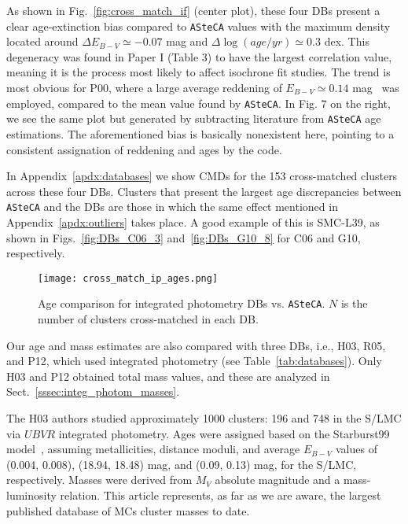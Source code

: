 \documentclass{aa}
\begin{document}
As shown in Fig.~\ref{fig:cross_match_if} (center plot), these four DBs
present a clear age-extinction bias compared to \texttt{ASteCA} values with the
maximum density located around $\Delta E_{B-V}{\simeq-}0.07$ mag and
$\Delta\log(age/yr){\simeq}0.3$ dex.
This degeneracy was found in Paper I (Table 3) to have the largest
correlation value, meaning it is the process most likely to affect isochrone fit
studies.
The trend is most obvious for P00, where a large average reddening of
$E_{B-V}{\simeq}0.14$ mag~\citep{de_Grijs_2006} was employed, compared to the
mean value found by \texttt{ASteCA}.
%
In Fig. 7 on the right, we see the same plot but generated by subtracting
literature from \texttt{ASteCA} age estimations.
The aforementioned bias is basically nonexistent here, pointing to a
consistent assignation of reddening and ages by the code.

In Appendix~\ref{apdx:databases} we show CMDs for the 153 cross-matched
clusters across these four DBs.
Clusters that present the largest age discrepancies between
\texttt{ASteCA} and the DBs are those in which the same effect mentioned in
Appendix~\ref{apdx:outliers} takes place. A good example of this is SMC-L39, as
shown in Figs.~\ref{fig:DBs_C06_3} and~\ref{fig:DBs_G10_8} for C06 and G10,
respectively.\\


%

\begin{figure}
\centering
\texttt{[image: cross\_match\_ip\_ages.png]}
\caption{Age comparison for integrated photometry DBs vs. \texttt{ASteCA}.
$N$ is the number of clusters cross-matched in each DB.\@}
\label{fig:cross_match_ip_age}
\end{figure}

Our age and mass estimates are also compared with three DBs, i.e., H03, R05, and
P12, which used integrated photometry (see Table~\ref{tab:databases}). Only H03
and P12 obtained total mass values, and these are analyzed in
Sect.~\ref{sssec:integ_photom_masses}.

The H03 authors studied approximately 1000 clusters: 196 and 748 in the
S/LMC via $UBVR$ integrated photometry.
Ages were assigned based on the Starburst99 model~\citep{Leitherer_1999},
assuming metallicities, distance moduli, and average $E_{B-V}$ values of (0.004,
0.008), (18.94, 18.48) mag, and  (0.09, 0.13) mag, for the S/LMC, respectively.
%
Masses were derived from $M_V$ absolute magnitude and a mass-luminosity
relation.
This article represents, as far as we are aware, the largest published database
of MCs cluster masses to date.
\end{document}
